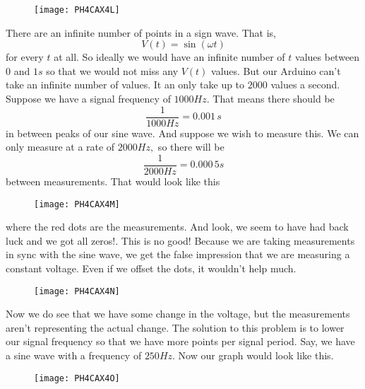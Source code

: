 \begin{figure}[h!]
\texttt{[image: PH4CAX4L]}
\end{figure}There are an infinite number of
points in a sign wave. That is, 
\begin{equation*}
V\left( t\right) =\sin \left( \omega t\right)
\end{equation*}%
for every $t$ at all. So ideally we would have an infinite number of $t$
values between $0$ and $1\unit{s}$ so that we would not miss any $V\left(
t\right) $ values. But our Arduino can't take an infinite number of values.
It an only take up to $2000$ values a second. Suppose we have a signal
frequency of $1000\unit{Hz}.$ That means there should be 
\begin{equation*}
\frac{1}{1000\unit{Hz}}=0.001\,\unit{s}
\end{equation*}
in between peaks of our sine wave. And suppose we wish to measure this. We
can only measure at a rate of $2000\unit{Hz},$ so there will be 
\begin{equation*}
\frac{1}{2000\unit{Hz}}=0.000\,5\unit{s}
\end{equation*}
between measurements. That would look like this

\begin{figure}[h!]
\texttt{[image: PH4CAX4M]}
\end{figure}

where the red dots are the measurements. And look, we seem to have had back
luck and we got all zeros!. This is no good! Because we are taking
measurements in sync with the sine wave, we get the false impression that we
are measuring a constant voltage. Even if we offset the dots, it wouldn't
help much.\begin{figure}[h!]
\texttt{[image: PH4CAX4N]}
\end{figure}Now we do see that we have some
change in the voltage, but the measurements aren't representing the actual
change. The solution to this problem is to lower our signal frequency so
that we have more points per signal period. Say, we have a sine wave with a
frequency of $250\unit{Hz}.$ Now our graph would look like this. \begin{figure}[h!]
\texttt{[image: PH4CAX4O]}
\end{figure}

